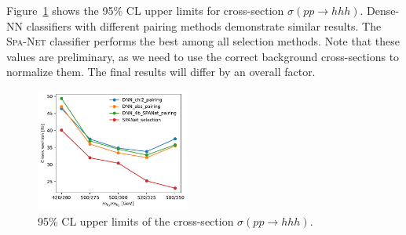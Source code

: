 \documentclass[12pt]{article}
\begin{document}
        Figure~\ref{fig:signal_strength_upper_limit_tem} shows the 95\% CL upper limits for cross-section $\sigma\left( pp \to hhh \right)$. Dense-NN classifiers with different pairing methods demonstrate similar results. The \textsc{Spa-Net} classifier performs the best among all selection methods. Note that these values are preliminary, as we need to use the correct background cross-sections to normalize them. The final results will differ by an overall factor.

        \begin{figure}[htpb]
            \centering
            \includegraphics[width=0.45\textwidth]{cross_section_upper_limit-TRSM-mix_5-250k.pdf}
            \caption{95\% CL upper limits of the cross-section $\sigma\left( pp \to hhh \right)$.}
            \label{fig:signal_strength_upper_limit_tem}
        \end{figure}


\end{document}
